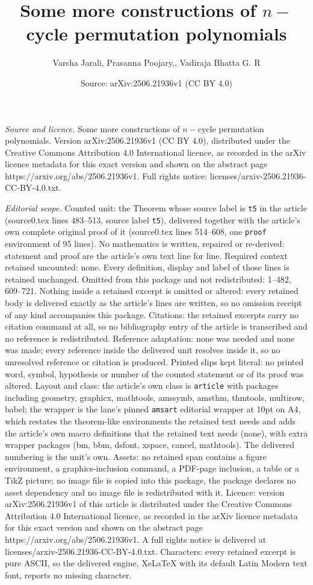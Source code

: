 \documentclass[10pt,a4paper]{amsart}
\title[Some more constructions of $n-$cycle permutation polynomials]{Some more constructions of $n-$cycle permutation polynomials}
\author{Varsha Jarali, Prasanna Poojary,, Vadiraja Bhatta G. R}
\date{Source: arXiv:2506.21936v1 (CC BY 4.0)}
\begin{document}
\maketitle

\noindent\emph{Source and licence.} Some more constructions of $n-$cycle permutation polynomials. Version arXiv:2506.21936v1 (CC BY 4.0), distributed under the Creative Commons Attribution 4.0 International licence, as recorded in the arXiv licence metadata for this exact version and shown on the abstract page https://arxiv.org/abs/2506.21936v1. Full rights notice: licenses/arxiv-2506.21936-CC-BY-4.0.txt.\par\smallskip

\noindent\textit{Editorial scope.} Counted unit: the Theorem whose source label is \texttt{t5} in the article (source0.tex lines 483--513, source label \texttt{t5}), delivered together with the article's own complete original proof of it (source0.tex lines 514--608, one \texttt{proof} environment of 95 lines). No mathematics is written, repaired or re-derived: statement and proof are the article's own text line for line. Required context retained uncounted: none. Every definition, display and label of those lines is retained unchanged. Omitted from this package and not redistributed: 1--482, 609--721. Nothing inside a retained excerpt is omitted or altered: every retained body is delivered exactly as the article's lines are written, so no omission receipt of any kind accompanies this package. Citations: the retained excerpts carry no citation command at all, so no bibliography entry of the article is transcribed and no reference is redistributed. Reference adaptation: none was needed and none was made; every reference inside the delivered unit resolves inside it, so no unresolved reference or citation is produced. Printed slips kept literal: no printed word, symbol, hypothesis or number of the counted statement or of its proof was altered. Layout and class: the article's own class is \texttt{article} with packages including geometry, graphicx, mathtools, amssymb, amsthm, thmtools, multirow, babel; the wrapper is the lane's pinned \texttt{amsart} editorial wrapper at 10pt on A4, which restates the theorem-like environments the retained text needs and adds the article's own macro definitions that the retained text needs (none), with extra wrapper packages (bm, bbm, dsfont, xspace, cancel, mathtools). The delivered numbering is the unit's own. Assets: no retained span contains a figure environment, a graphics-inclusion command, a PDF-page inclusion, a table or a TikZ picture; no image file is copied into this package, the package declares no asset dependency and no image file is redistributed with it. Licence: version arXiv:2506.21936v1 of this article is distributed under the Creative Commons Attribution 4.0 International licence, as recorded in the arXiv licence metadata for this exact version and shown on the abstract page https://arxiv.org/abs/2506.21936v1. A full rights notice is delivered at licenses/arxiv-2506.21936-CC-BY-4.0.txt. Characters: every retained excerpt is pure ASCII, so the delivered engine, XeLaTeX with its default Latin Modern text font, reports no missing character.
\end{document}
